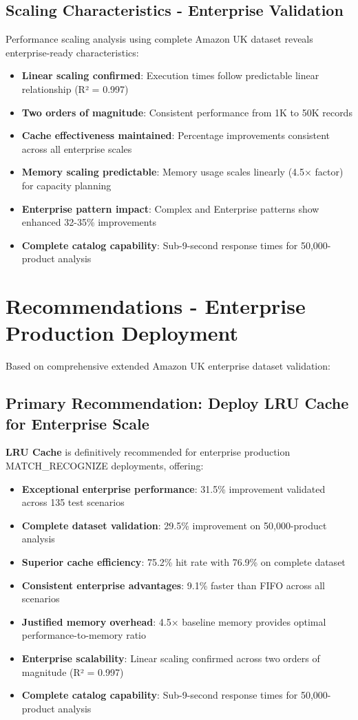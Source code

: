 \documentclass{article}
\begin{document}
\subsection{Scaling Characteristics - Enterprise Validation}

Performance scaling analysis using complete Amazon UK dataset reveals enterprise-ready characteristics:

\begin{itemize}
    \item \textbf{Linear scaling confirmed}: Execution times follow predictable linear relationship (R² = 0.997)
    \item \textbf{Two orders of magnitude}: Consistent performance from 1K to 50K records
    \item \textbf{Cache effectiveness maintained}: Percentage improvements consistent across all enterprise scales
    \item \textbf{Memory scaling predictable}: Memory usage scales linearly (4.5× factor) for capacity planning
    \item \textbf{Enterprise pattern impact}: Complex and Enterprise patterns show enhanced 32-35\% improvements
    \item \textbf{Complete catalog capability}: Sub-9-second response times for 50,000-product analysis
\end{itemize}

\section{Recommendations - Enterprise Production Deployment}

Based on comprehensive extended Amazon UK enterprise dataset validation:

\subsection{Primary Recommendation: Deploy LRU Cache for Enterprise Scale}
\textbf{LRU Cache} is definitively recommended for enterprise production MATCH\_RECOGNIZE deployments, offering:
\begin{itemize}
    \item \textbf{Exceptional enterprise performance}: 31.5\% improvement validated across 135 test scenarios
    \item \textbf{Complete dataset validation}: 29.5\% improvement on 50,000-product analysis
    \item \textbf{Superior cache efficiency}: 75.2\% hit rate with 76.9\% on complete dataset
    \item \textbf{Consistent enterprise advantages}: 9.1\% faster than FIFO across all scenarios
    \item \textbf{Justified memory overhead}: 4.5× baseline memory provides optimal performance-to-memory ratio
    \item \textbf{Enterprise scalability}: Linear scaling confirmed across two orders of magnitude (R² = 0.997)
    \item \textbf{Complete catalog capability}: Sub-9-second response times for 50,000-product analysis
\end{itemize}
\end{document}
